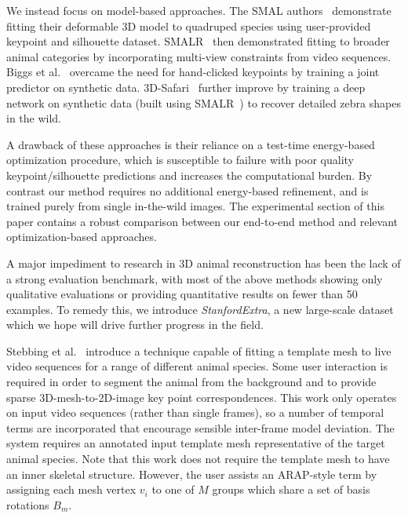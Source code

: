 We instead focus on model-based approaches. The SMAL authors~\cite{zuffi2017menagerie} demonstrate fitting their deformable 3D model to quadruped species using user-provided keypoint and silhouette dataset. SMALR~\cite{zuffi_lions} then demonstrated fitting to broader animal categories by incorporating multi-view constraints from video sequences. Biggs et al.~\cite{biggs2018creatures} overcame the need for hand-clicked keypoints by training a joint predictor on synthetic data. 3D-Safari~\cite{Zuffi19Safari} further improve by training a deep network on synthetic data (built using SMALR~\cite{zuffi_lions}) to recover detailed zebra shapes in the wild.

A drawback of these approaches is their reliance on a test-time energy-based optimization procedure, which is susceptible to failure with poor quality keypoint/silhouette predictions and increases the computational burden. By contrast our method requires no additional energy-based refinement, and is trained purely from single in-the-wild images. The experimental section of this paper contains a robust comparison between our end-to-end method and relevant optimization-based approaches. 


A major impediment to research in 3D animal reconstruction has been the lack of a strong evaluation benchmark, with most of the above methods showing only qualitative evaluations or providing quantitative results on fewer than 50 examples. To remedy this, we introduce \emph{StanfordExtra}, a new large-scale dataset which we hope will drive further progress in the field. 


Stebbing et al.~\cite{arap_stebbing} introduce a technique capable of fitting a template mesh to live video sequences for a range of different animal species. Some user interaction is required in order to segment the animal from the background and to provide sparse 3D-mesh-to-2D-image key point correspondences. This work only operates on input video sequences (rather than single frames), so a number of temporal terms are incorporated that encourage sensible inter-frame model deviation. The system requires an annotated input template mesh representative of the target animal species. Note that this work does not require the template mesh to have an inner skeletal structure. However, the user assists an ARAP-style term by assigning each mesh vertex $v_i$ to one of $M$ groups which share a set of basis rotations $B_{m}$. 

